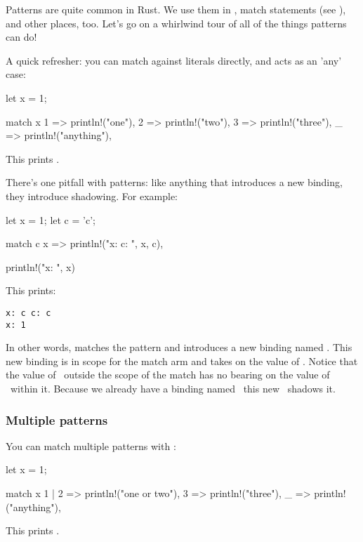 Patterns are quite common in Rust. We use them in , match statements (see ),
and other places, too. Let's go on a whirlwind tour of all of the things patterns can do!

\blank

A quick refresher: you can match against literals directly, and \code{\_} acts as an 'any' case:

\begin{rustc}
let x = 1;

match x {
    1 => println!("one"),
    2 => println!("two"),
    3 => println!("three"),
    _ => println!("anything"),
}
\end{rustc}

This prints .

There's one pitfall with patterns: like anything that introduces a new binding, they introduce shadowing. For example:

\begin{rustc}
let x = 1;
let c = 'c';

match c {
    x => println!("x: {} c: {}", x, c),
}

println!("x: {}", x)
\end{rustc}

This prints:

\begin{verbatim}
x: c c: c
x: 1
\end{verbatim}

In other words,  matches the pattern and introduces a new binding named \x. This new binding is in scope for the match arm 
and takes on the value of . Notice that the value of \x\ outside the scope of the match has no bearing on the value of \x\ 
within it. Because we already have a binding named \x\, this new \x\ shadows it.

\subsubsection*{Multiple patterns}

You can match multiple patterns with \code{|}:

\begin{rustc}
let x = 1;

match x {
    1 | 2 => println!("one or two"),
    3 => println!("three"),
    _ => println!("anything"),
}
\end{rustc}

This prints .

